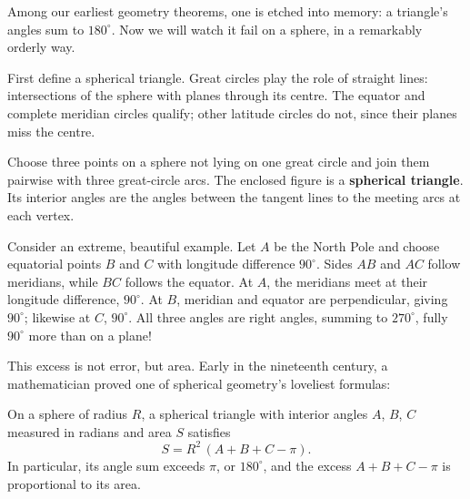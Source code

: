 Among our earliest geometry theorems, one is etched into memory: a triangle's angles sum to $180^\circ$. Now we will watch it fail on a sphere, in a remarkably orderly way.

First define a spherical triangle. Great circles play the role of straight lines: intersections of the sphere with planes through its centre. The equator and complete meridian circles qualify; other latitude circles do not, since their planes miss the centre.

\begin{dingyi}
Choose three points on a sphere not lying on one great circle and join them pairwise with three great-circle arcs. The enclosed figure is a \textbf{spherical triangle}. Its interior angles are the angles between the tangent lines to the meeting arcs at each vertex.
\end{dingyi}

Consider an extreme, beautiful example. Let $A$ be the North Pole and choose equatorial points $B$ and $C$ with longitude difference $90^\circ$. Sides $AB$ and $AC$ follow meridians, while $BC$ follows the equator. At $A$, the meridians meet at their longitude difference, $90^\circ$. At $B$, meridian and equator are perpendicular, giving $90^\circ$; likewise at $C$, $90^\circ$. All three angles are right angles, summing to $270^\circ$, fully $90^\circ$ more than on a plane!

This excess is not error, but area. Early in the nineteenth century, a mathematician proved one of spherical geometry's loveliest formulas:

\begin{dingli}
On a sphere of radius $R$, a spherical triangle with interior angles $A$, $B$, $C$ measured in radians and area $S$ satisfies
\[ S = R^2\,(A + B + C - \pi). \]
In particular, its angle sum exceeds $\pi$, or $180^\circ$, and the excess $A+B+C-\pi$ is proportional to its area.
\end{dingli}

